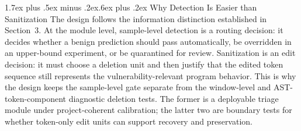 \documentclass[letterpaper,twocolumn,10pt,twoside]{article}
\makeatletter
\renewcommand\subsection{\@startsection{subsection}{2}{\z@}%
  {1.7ex plus .5ex minus .2ex}{.6ex plus .2ex}%
  {\normalfont\normalsize\bfseries}}
\newcommand{\gate}{sample-level gate}
\makeatother
\begin{document}
\subsection{Why Detection Is Easier than Sanitization}
The design follows the information distinction established in Section~3. At the module level, sample-level detection is a routing decision: it decides whether a benign prediction should pass automatically, be overridden in an upper-bound experiment, or be quarantined for review. Sanitization is an edit decision: it must choose a deletion unit and then justify that the edited token sequence still represents the vulnerability-relevant program behavior. This is why the design keeps the \gate{} separate from the window-level and AST-token-component diagnostic deletion tests. The former is a deployable triage module under project-coherent calibration; the latter two are boundary tests for whether token-only edit units can support recovery and preservation.
\end{document}
